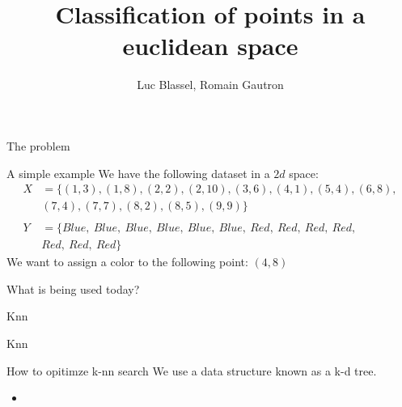 \documentclass[11 pt]{beamer}
\title{Classification of points in a euclidean space}
\author{Luc Blassel, Romain Gautron}
\begin{document}
\maketitle

\begin{frame}{The problem}

\end{frame}

\begin{frame}[c]{A simple example}
  We have the following dataset in a $2d$ space:
  \begin{align*}
    X &=\{(1, 3),(1, 8), (2, 2), (2, 10), (3, 6), (4, 1), (5, 4), (6, 8), \\&(7, 4), (7, 7), (8, 2), (8, 5), (9, 9)\}\\
    &\\
    Y &= \{Blue,\ Blue,\ Blue,\ Blue,\ Blue,\ Blue,\ Red,\ Red,\ Red,\ Red,\ \\& Red,\ Red,\ Red \}
  \end{align*}
  We want to assign a color to the following point: $(4,8)$\
\end{frame}

\begin{frame}{What is being used today?}

\end{frame}

\begin{frame}{Knn}

\end{frame}

\begin{frame}{Knn}

\end{frame}

\begin{frame}{How to opitimze k-nn search}
  We use a data structure known as a k-d tree.
  \begin{itemize}
    \item
  \end{itemize}
\end{frame}
\end{document}
